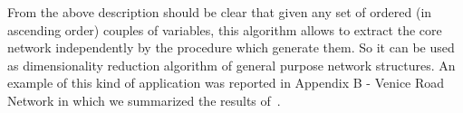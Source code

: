 \documentclass{standalone}
\begin{document}
From the above description should be clear that given any set of ordered (in ascending order) couples of variables, this algorithm allows to extract the core network independently by the procedure which generate them.
So it can be used as dimensionality reduction algorithm of general purpose network structures.
An example of this kind of application was reported in Appendix B - Venice Road Network in which we summarized the results of~\cite{Mizzi2018, CurtiSDPS2018}.
\end{document}
